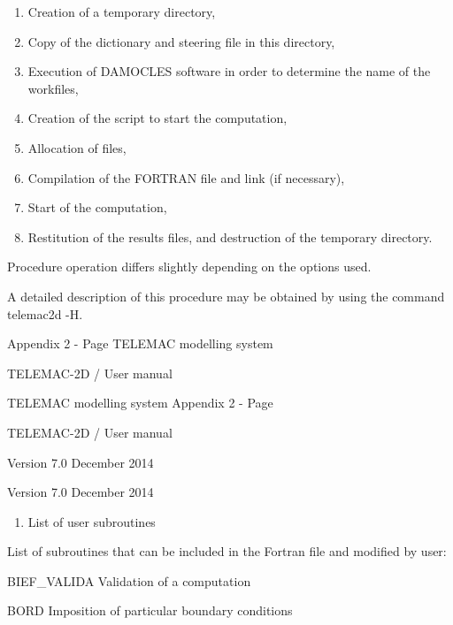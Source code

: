 \documentclass{article} %
\begin{document}
\begin{enumerate}
\item  Creation of a temporary directory,

\item  Copy of the dictionary and steering file in this directory,

\item  Execution of DAMOCLES software in order to determine the name of the workfiles,

\item  Creation of the script to start the computation,

\item  Allocation of files,

\item  Compilation of the FORTRAN file and link (if necessary),

\item  Start of the computation,

\item  Restitution of the results files, and destruction of the temporary directory.
\end{enumerate}



 Procedure operation differs slightly depending on the options used.

 A detailed description of this procedure may be obtained by using the command telemac2d -H.

 Appendix 2 - Page   TELEMAC modelling system

 TELEMAC-2D / User manual



 TELEMAC modelling system Appendix 2 - Page

 TELEMAC-2D / User manual



 Version 7.0 December 2014

 Version 7.0 December 2014

\begin{enumerate}
\item   List of user subroutines
\end{enumerate}

 List of subroutines that can be included in the Fortran file and modified by user:



 BIEF\_VALIDA Validation of a computation

 BORD Imposition of particular boundary conditions
\end{document}
